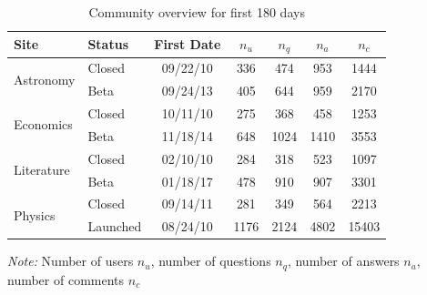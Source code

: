 \begin{table}[h]
	\caption{Community overview for first 180 days }
	\label{tab:site-info}
	\begin{tabular}{llccccc}
		\hline
		Site                 & Status                           & First Date                     & $n_u$                    & $n_q$                & $n_a$                  & $n_c$ \\ \hline
		\multirow{2}{*}{Astronomy}  & \multicolumn{1}{l|}{Closed}      & \multicolumn{1}{c|}{09/22/10} & \multicolumn{1}{c|}{336}  & \multicolumn{1}{c|}{474}  & \multicolumn{1}{c|}{953}  & 1444     \\
		& \multicolumn{1}{l|}{Beta} & \multicolumn{1}{c|}{09/24/13} & \multicolumn{1}{c|}{405}  & \multicolumn{1}{c|}{644}  & \multicolumn{1}{c|}{959}  & 2170     \\ \hline
		\multirow{2}{*}{Economics}  & \multicolumn{1}{l|}{Closed}      & \multicolumn{1}{c|}{10/11/10} & \multicolumn{1}{c|}{275}  & \multicolumn{1}{c|}{368}  & \multicolumn{1}{c|}{458}  & 1253     \\
		& \multicolumn{1}{l|}{Beta} & \multicolumn{1}{c|}{11/18/14} & \multicolumn{1}{c|}{648}  & \multicolumn{1}{c|}{1024} & \multicolumn{1}{c|}{1410} & 3553     \\ \hline
		\multirow{2}{*}{Literature} & \multicolumn{1}{l|}{Closed}      & \multicolumn{1}{c|}{02/10/10} & \multicolumn{1}{c|}{284}  & \multicolumn{1}{c|}{318}  & \multicolumn{1}{c|}{523}  & 1097     \\
		& \multicolumn{1}{l|}{Beta} & \multicolumn{1}{c|}{01/18/17} & \multicolumn{1}{c|}{478}  & \multicolumn{1}{c|}{910}  & \multicolumn{1}{c|}{907}  & 3301     \\ \hline
		\multirow{2}{*}{Physics}    & \multicolumn{1}{l|}{Closed}      & \multicolumn{1}{c|}{09/14/11} & \multicolumn{1}{c|}{281}  & \multicolumn{1}{c|}{349}  & \multicolumn{1}{c|}{564}  & 2213     \\
		& \multicolumn{1}{l|}{Launched}    & \multicolumn{1}{c|}{08/24/10} & \multicolumn{1}{c|}{1176} & \multicolumn{1}{c|}{2124} & \multicolumn{1}{c|}{4802} & 15403    \\
		\bottomrule
	\end{tabular}
	{\raggedright \textit{Note:} Number of users $n_u$, number of questions $n_q$, number of answers $n_a$, number of comments $n_c$ \par}
	
\end{table}
